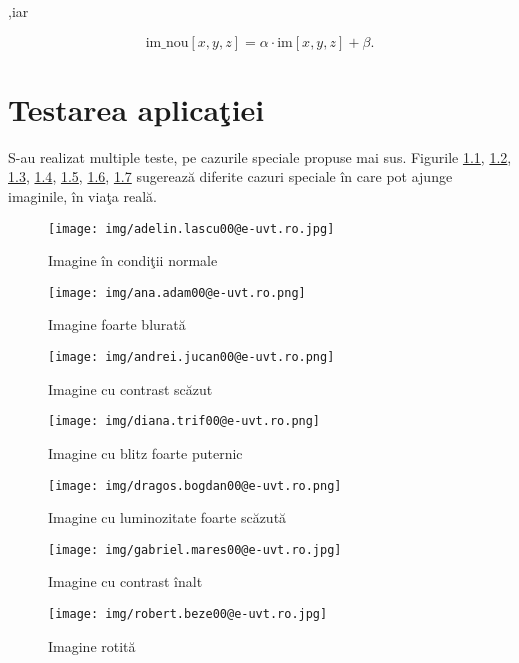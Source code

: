 \documentclass{report}
\begin{document}
,iar 

$$\text{im_nou}[x,y,z] = \alpha \cdot \text{im}[x,y,z] + \beta.$$

\chapter{Testarea aplica\c tiei}

S-au realizat multiple teste, pe cazurile speciale propuse mai sus.
Figurile \ref{t1}, \ref{t2}, \ref{t3}, \ref{t4}, \ref{t5}, \ref{t6}, \ref{t7} sugereaz\u a diferite cazuri speciale în care pot ajunge imaginile, în via\c ta real\u a.

\begin{figure}[h!]
    \centering
    \texttt{[image: img/adelin.lascu00@e-uvt.ro.jpg]}
    \caption{Imagine în condi\c tii normale}
    \label{t1}
\end{figure}

\begin{figure}[h!]
    \centering
    \texttt{[image: img/ana.adam00@e-uvt.ro.png]}
    \caption{Imagine foarte blurat\u a}
    \label{t2}
\end{figure}

\begin{figure}[h!]
    \centering
    \texttt{[image: img/andrei.jucan00@e-uvt.ro.png]}
    \caption{Imagine cu contrast sc\u azut}
    \label{t3}
\end{figure}

\begin{figure}[h!]
    \centering
    \texttt{[image: img/diana.trif00@e-uvt.ro.png]}
    \caption{Imagine cu blitz foarte puternic}
    \label{t4}
\end{figure}

\begin{figure}[h!]
    \centering
    \texttt{[image: img/dragos.bogdan00@e-uvt.ro.png]}
    \caption{Imagine cu luminozitate foarte sc\u azut\u a}
    \label{t5}
\end{figure}

\begin{figure}[h!]
    \centering
    \texttt{[image: img/gabriel.mares00@e-uvt.ro.jpg]}
    \caption{Imagine cu contrast înalt}
    \label{t6}
\end{figure}

\begin{figure}[h!]
    \centering
    \texttt{[image: img/robert.beze00@e-uvt.ro.jpg]}
    \caption{Imagine rotit\u a}
    \label{t7}
\end{figure}
\end{document}
